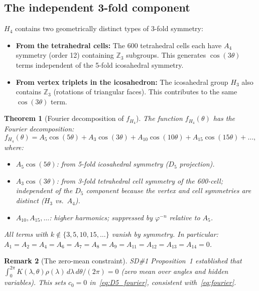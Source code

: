 \documentclass[11pt,a4paper]{article}
\newtheorem{theorem}{Theorem}[section]
\newtheorem{remark}[theorem]{Remark}
\newcommand{\phig}{\varphi}
\begin{document}
\subsection{The independent 3-fold component}

$H_4$ contains two geometrically distinct types of 3-fold symmetry:
\begin{itemize}
\item \textbf{From the tetrahedral cells:} The 600 tetrahedral cells
  each have $A_4$ symmetry (order 12) containing $\mathbb{Z}_3$
  subgroups.  This generates $\cos(3\theta)$ terms independent of
  the 5-fold icosahedral symmetry.
\item \textbf{From vertex triplets in the icosahedron:} The
  icosahedral group $H_3$ also contains $\mathbb{Z}_3$ (rotations of
  triangular faces).  This contributes to the same $\cos(3\theta)$ term.
\end{itemize}

\begin{theorem}[Fourier decomposition of $f_{H_4}$]
\label{thm:fourier}
The function $f_{H_4}(\theta)$ has the Fourier decomposition:
\begin{equation}
f_{H_4}(\theta)
= A_5\cos(5\theta) + A_3\cos(3\theta) + A_{10}\cos(10\theta)
+ A_{15}\cos(15\theta) + \ldots,
\label{eq:fourier}
\end{equation}
where:
\begin{itemize}
\item $A_5\cos(5\theta)$: from 5-fold icosahedral symmetry ($D_5$
  projection).
\item $A_3\cos(3\theta)$: from 3-fold tetrahedral cell symmetry of
  the 600-cell; independent of the $D_5$ component because the vertex
  and cell symmetries are distinct ($H_3$ vs.\ $A_4$).
\item $A_{10}, A_{15}, \ldots$: higher harmonics; suppressed by
  $\phig^{-n}$ relative to $A_5$.
\end{itemize}
All terms with $k \not\in \{3, 5, 10, 15, \ldots\}$ vanish by
symmetry.  In particular: $A_1 = A_2 = A_4 = A_6 = A_7 = A_8 =
A_9 = A_{11} = A_{12} = A_{13} = A_{14} = 0$.
\end{theorem}

\begin{remark}[The zero-mean constraint]
SD\#1 Proposition~1 established that $\int_0^{2\pi} K(\lambda,\theta)
\rho(\lambda)\,d\lambda\,d\theta/(2\pi) = 0$ (zero mean over angles
and hidden variables).  This sets $c_0 = 0$ in~\eqref{eq:D5_fourier},
consistent with~\eqref{eq:fourier}.
\end{remark}
\end{document}
